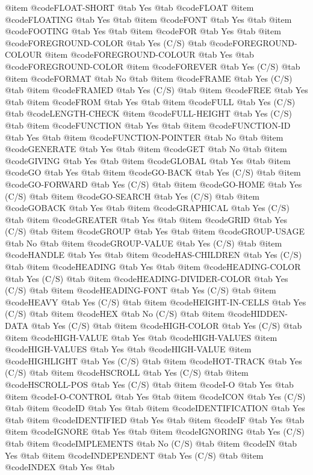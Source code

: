 @item @code{FLOAT-SHORT} @tab Yes @tab @code{FLOAT}
@item @code{FLOATING} @tab Yes @tab
@item @code{FONT} @tab Yes @tab
@item @code{FOOTING} @tab Yes @tab
@item @code{FOR} @tab Yes @tab
@item @code{FOREGROUND-COLOR} @tab Yes	(C/S) @tab @code{FOREGROUND-COLOUR}
@item @code{FOREGROUND-COLOUR} @tab Yes @tab @code{FOREGROUND-COLOR}
@item @code{FOREVER} @tab Yes	(C/S) @tab
@item @code{FORMAT} @tab No @tab
@item @code{FRAME} @tab Yes	(C/S) @tab
@item @code{FRAMED} @tab Yes	(C/S) @tab
@item @code{FREE} @tab Yes @tab
@item @code{FROM} @tab Yes @tab
@item @code{FULL} @tab Yes	(C/S) @tab @code{LENGTH-CHECK}
@item @code{FULL-HEIGHT} @tab Yes	(C/S) @tab
@item @code{FUNCTION} @tab Yes @tab
@item @code{FUNCTION-ID} @tab Yes @tab
@item @code{FUNCTION-POINTER} @tab No @tab
@item @code{GENERATE} @tab Yes @tab
@item @code{GET} @tab No @tab
@item @code{GIVING} @tab Yes @tab
@item @code{GLOBAL} @tab Yes @tab
@item @code{GO} @tab Yes @tab
@item @code{GO-BACK} @tab Yes	(C/S) @tab
@item @code{GO-FORWARD} @tab Yes	(C/S) @tab
@item @code{GO-HOME} @tab Yes	(C/S) @tab
@item @code{GO-SEARCH} @tab Yes	(C/S) @tab
@item @code{GOBACK} @tab Yes @tab
@item @code{GRAPHICAL} @tab Yes	(C/S) @tab
@item @code{GREATER} @tab Yes @tab
@item @code{GRID} @tab Yes	(C/S) @tab
@item @code{GROUP} @tab Yes @tab
@item @code{GROUP-USAGE} @tab No @tab
@item @code{GROUP-VALUE} @tab Yes	(C/S) @tab
@item @code{HANDLE} @tab Yes @tab
@item @code{HAS-CHILDREN} @tab Yes	(C/S) @tab
@item @code{HEADING} @tab Yes @tab
@item @code{HEADING-COLOR} @tab Yes	(C/S) @tab
@item @code{HEADING-DIVIDER-COLOR} @tab Yes	(C/S) @tab
@item @code{HEADING-FONT} @tab Yes	(C/S) @tab
@item @code{HEAVY} @tab Yes	(C/S) @tab
@item @code{HEIGHT-IN-CELLS} @tab Yes	(C/S) @tab
@item @code{HEX} @tab No	(C/S) @tab
@item @code{HIDDEN-DATA} @tab Yes	(C/S) @tab
@item @code{HIGH-COLOR} @tab Yes	(C/S) @tab
@item @code{HIGH-VALUE} @tab Yes @tab @code{HIGH-VALUES}
@item @code{HIGH-VALUES} @tab Yes @tab @code{HIGH-VALUE}
@item @code{HIGHLIGHT} @tab Yes	(C/S) @tab
@item @code{HOT-TRACK} @tab Yes	(C/S) @tab
@item @code{HSCROLL} @tab Yes	(C/S) @tab
@item @code{HSCROLL-POS} @tab Yes	(C/S) @tab
@item @code{I-O} @tab Yes @tab
@item @code{I-O-CONTROL} @tab Yes @tab
@item @code{ICON} @tab Yes	(C/S) @tab
@item @code{ID} @tab Yes @tab
@item @code{IDENTIFICATION} @tab Yes @tab
@item @code{IDENTIFIED} @tab Yes @tab
@item @code{IF} @tab Yes @tab
@item @code{IGNORE} @tab Yes @tab
@item @code{IGNORING} @tab Yes	(C/S) @tab
@item @code{IMPLEMENTS} @tab No	(C/S) @tab
@item @code{IN} @tab Yes @tab
@item @code{INDEPENDENT} @tab Yes	(C/S) @tab
@item @code{INDEX} @tab Yes @tab
